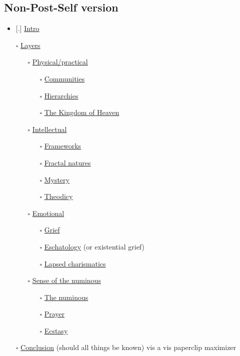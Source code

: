 \hypertarget{non-post-self-version}{%
\subsection{Non-Post-Self version}\label{non-post-self-version}}

\begin{itemize}
\tightlist
\item
  {[}.{]} \href{mfa/intro}{Intro}
\item[$\square$]
  \href{mfa/layers}{Layers}

  \begin{itemize}
  \tightlist
  \item[$\square$]
    \href{mfa/section-practical}{Physical/practical}

    \begin{itemize}
    \tightlist
    \item[$\square$]
      \href{mfa/communities}{Communities}
    \item[$\square$]
      \href{mfa/hierarchies}{Hierarchies}
    \item[$\square$]
      \href{mfa/kingdom}{The Kingdom of Heaven}
    \end{itemize}
  \item[$\square$]
    \href{mfa/section-intellectual}{Intellectual}

    \begin{itemize}
    \tightlist
    \item[$\square$]
      \href{mfa/frameworks}{Frameworks}
    \item[$\square$]
      \href{mfa/fractal}{Fractal natures}
    \item[$\square$]
      \href{mfa/mystery}{Mystery}
    \item[$\square$]
      \href{mfa/theodicy}{Theodicy}
    \end{itemize}
  \item[$\square$]
    \href{mfa/section-emotional}{Emotional}

    \begin{itemize}
    \tightlist
    \item[$\square$]
      \href{mfa/grief}{Grief}
    \item[$\square$]
      \href{mfa/eschatology}{Eschatology} (or existential grief)
    \item[$\square$]
      \href{mfa/charismatics}{Lapsed charismatics}
    \end{itemize}
  \item[$\square$]
    \href{mfa/section-numinous}{Sense of the numinous}

    \begin{itemize}
    \tightlist
    \item[$\square$]
      \href{mfa/numinous}{The numinous}
    \item[$\square$]
      \href{mfa/prayer}{Prayer}
    \item[$\square$]
      \href{mfa/ecstasy}{Ecstasy}
    \end{itemize}
  \end{itemize}
\item[$\square$]
  \href{mfa/conclusion}{Conclusion} (should all things be known) vis a vis paperclip maximizer
\end{itemize}
